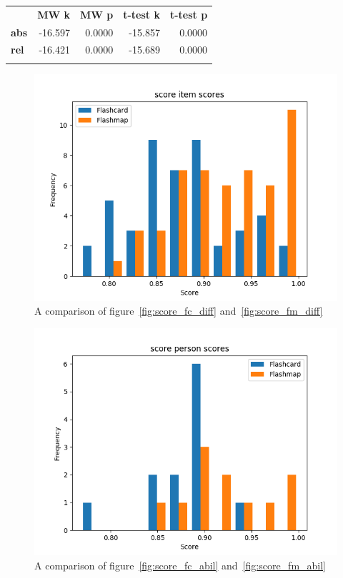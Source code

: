 \begin{longtable}[c]{@{}lrrrr@{}}
\toprule\addlinespace
& \textbf{MW k} & \textbf{MW p} &
\textbf{t-test k} & \textbf{t-test p}
\\\addlinespace
\midrule
\textbf{abs} & -16.597 & 0.0000 & -15.857 & 0.0000
\\\addlinespace
\textbf{rel} & -16.421 & 0.0000 & -15.689 & 0.0000
\\\addlinespace
\bottomrule
    \label{tab:score_comp}
\end{longtable}

\begin{figure}
    \includegraphics[width=\textwidth]{img/score_diff.png}
    \caption{A comparison of figure~\protect\ref{fig:score_fc_diff} and~\protect\ref{fig:score_fm_diff}}
    \label{fig:score_diff}
\end{figure}
\begin{figure}
    \includegraphics[width=\textwidth]{img/score_abil.png}
    \caption{A comparison of figure~\protect\ref{fig:score_fc_abil} and~\protect\ref{fig:score_fm_abil}}
    \label{fig:score_abil}
\end{figure}

